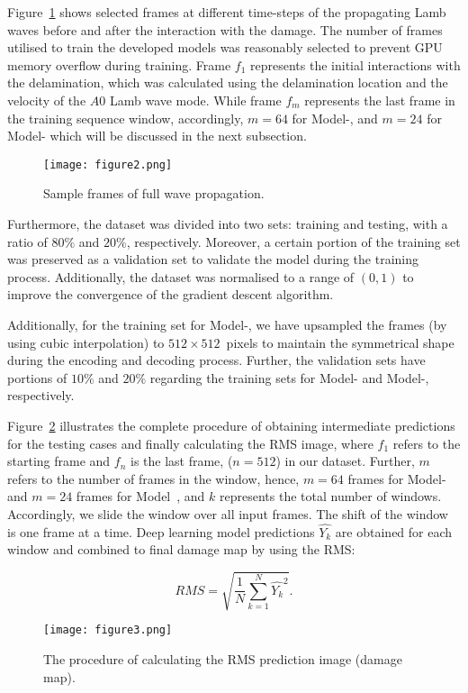 \begin{sloppypar}
	Figure~\ref{fig:Full_wave} shows selected frames at different time-steps of the propagating Lamb waves before and after the interaction with the damage.
	The number of frames utilised to train the developed models was reasonably selected to prevent GPU memory overflow during training. 
	Frame \(f_{1}\) represents the initial interactions with the delamination, which was calculated using the delamination location and the velocity of the \(A0\) Lamb wave mode.
	While frame \(f_{m}\) represents the last frame in the training sequence window, accordingly, \(m=64\) for Model-, and \(m=24\) for Model- which will be discussed in the next subsection.
	\begin{figure}[!ht]
		\centering
		\texttt{[image: figure2.png]}
		\caption{Sample frames of full wave propagation.}
		\label{fig:Full_wave}
	\end{figure}
	
	Furthermore, the dataset was divided into two sets: training and testing, with a ratio of \(80\%\) and \(20\% \), respectively.
	Moreover, a certain portion of the training set was preserved as a validation set to validate the model during the training process.
	Additionally, the dataset was normalised to a range of \((0, 1)\) to improve the convergence of the gradient descent algorithm.
	
	Additionally, for the training set for Model-, we have upsampled the frames (by using cubic interpolation) to \(512\times512\)~pixels to maintain the symmetrical shape during the encoding and decoding process.
	Further, the validation sets have portions of \(10\%\) and \(20\%\) regarding the training sets for Model- and Model-, respectively.
	
	Figure~\ref{fig:Diagram_exp_predictions} illustrates the complete procedure of obtaining intermediate predictions for the testing cases and finally calculating the RMS image, where \(f_{1}\) refers to the starting frame and \(f_{n}\) is the last frame, (\(n=512\)) in our dataset.
	Further, \(m\) refers to the number of frames in the window, hence, \(m=64\) frames for Model- and \(m=24\) frames for Model~, and \(k\) represents the total number of windows.
	Accordingly, we slide the window over all input frames.
	The shift of the window is one frame at a time.
	Deep learning model predictions \(\hat{Y_k}\) are obtained for each window and combined to final damage map by using the RMS:
	
	\begin{equation}
		RMS = \sqrt{\frac{1}{N}\sum_{k=1}^{N}\hat{Y_k}^2}.	
		\label{RMS}
	\end{equation}
	\begin{figure}[!ht]
		\centering
		\texttt{[image: figure3.png]}
		\caption{The procedure of calculating the RMS prediction image (damage map).}
		\label{fig:Diagram_exp_predictions}
	\end{figure}
\end{sloppypar}
\newpage